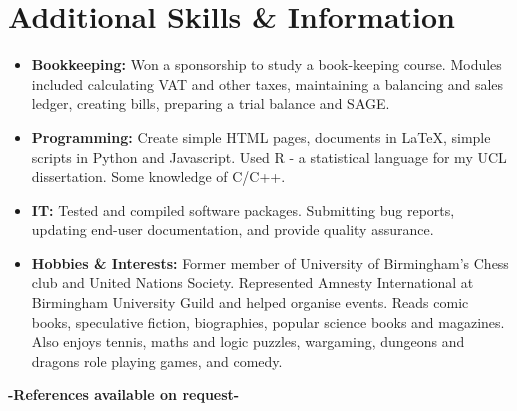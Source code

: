 \documentclass[11pt]{article} %
\begin{document}
\section*{Additional Skills \& Information}

\begin{itemize}
\item {\bf Bookkeeping:} Won a sponsorship to study a
 book-keeping course. Modules included calculating VAT and other taxes, maintaining 
a balancing and sales ledger, creating bills, preparing a trial balance and SAGE. 
\end{itemize}
\begin{itemize}
\item {\bf Programming:} Create simple HTML pages, documents in  \LaTeX,  
simple scripts in Python and Javascript. Used R - a statistical language for 
 my UCL dissertation. Some knowledge of C/C++.
\end{itemize}
\begin{itemize}
\item {\bf IT:} Tested and compiled software packages. Submitting bug reports, 
updating end-user documentation, and provide quality assurance. 
\end{itemize}
\begin{itemize} 
\item {\bf Hobbies \& Interests:} Former member of University of Birmingham's Chess club and United
Nations Society. Represented Amnesty International at Birmingham University Guild
and helped organise events. Reads comic books, speculative fiction, biographies, popular science 
books and magazines. Also enjoys tennis, maths and logic puzzles, 
wargaming, dungeons and dragons role playing games, and comedy. 
\end{itemize}
\vspace{10pt}
\centering\bf{-References available on request-}
\end{document}
